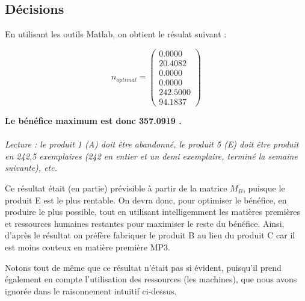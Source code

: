 \subsection{Décisions}

En utilisant les outils Matlab, on obtient le résulat suivant :

\[
	n_{optimal} = 
\begin{pmatrix}
    0.0000 \\
   20.4082 \\
    0.0000 \\
    0.0000 \\
  242.5000 \\
   94.1837
\end{pmatrix}
\]

\begin{center}

\textbf{Le bénéfice maximum est donc 357.0919 \textcurrency.\\}
~\\
\textit{Lecture : le produit 1 (A) doit être abandonné, le produit 5 (E) doit
être produit en 242,5 exemplaires (242 en entier et un demi exemplaire, terminé la semaine suivante), etc.}
\end{center}
Ce résultat était (en partie) prévisible à partir de la matrice $M_{B}$, puisque le produit E est le plus rentable. On devra donc, pour optimiser le bénéfice, en produire le plus possible, tout en utilisant intelligemment les matières premières et ressources humaines restantes pour maximiser le reste du bénéfice. Ainsi, d'après le résultat on préfère fabriquer le produit B au lieu du produit C car il est moins couteux en matière première MP3.

Notons tout de même que ce résultat n'était pas si évident, puisqu'il prend également en compte l'utilisation des ressources (les machines), que nous avons ignorée dans le raisonnement \og intuitif \fg ci-dessus.


